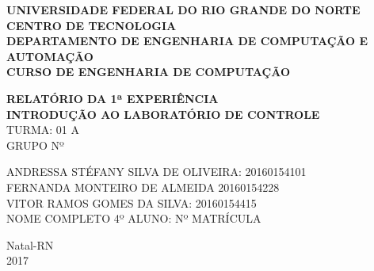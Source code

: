 \documentclass[a4paper,12pt]{article}
\begin{document}
\onehalfspacing

\thispagestyle{empty}

\setcounter{page}{1}


\begin{figure}[!ht]

\centering

\hspace{11.09cm}

\label{Logos}

\end{figure}


\vspace{-1cm}

\begin{center}
{\bf{\normalsize UNIVERSIDADE FEDERAL DO RIO GRANDE DO NORTE\\
CENTRO DE TECNOLOGIA\\
DEPARTAMENTO DE ENGENHARIA DE COMPUTAÇÃO E AUTOMAÇÃO\\
CURSO DE ENGENHARIA DE COMPUTAÇÃO
}}


\vspace{3.6cm}

{\bf{\large RELATÓRIO DA 1ª EXPERIÊNCIA\\
INTRODUÇÃO AO LABORATÓRIO DE CONTROLE\\
}}
\vspace{1.5cm}
{\large TURMA: 01 A\\
	GRUPO Nº}

\vspace{3.6cm}



\begin{flushright}
\begin{normalsize}
ANDRESSA STÉFANY SILVA DE OLIVEIRA: 20160154101\\
\vspace{0.8cm}
FERNANDA MONTEIRO DE ALMEIDA 20160154228\\
\vspace{0.8cm}
VITOR RAMOS GOMES DA SILVA: 20160154415\\
\vspace{0.8cm}
NOME COMPLETO 4º ALUNO: Nº MATRÍCULA\\
\end{normalsize}
\end{flushright}


\vspace{2.5cm}

{\large Natal-RN\\
2017}

\end{center}
\end{document}
